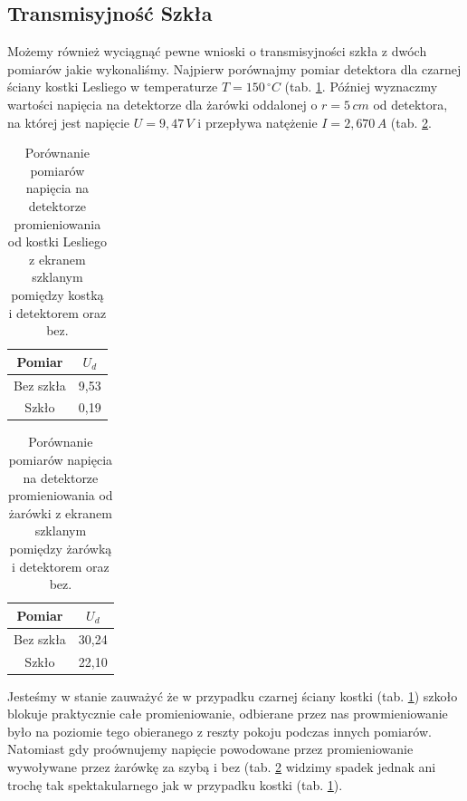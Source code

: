 \documentclass[12pt]{article}
\begin{document}
\subsection{Transmisyjność Szkła}
Możemy również wyciągnąć pewne wnioski o transmisyjności szkła z dwóch pomiarów jakie wykonaliśmy. Najpierw porównajmy pomiar detektora dla czarnej ściany kostki Lesliego w temperaturze $T = 150 \, ^{\circ}C$ (tab. \ref{tab:cube_glass}. Później wyznaczmy wartości napięcia na detektorze dla żarówki oddalonej o $r = 5 \, cm$ od detektora, na której jest napięcie $U = 9{,}47 \, V$ i przepływa natężenie $I = 2{,}670 \, A$ (tab. \ref{tab:bulb_glass}.
\begin{table}[H]
    \centering
    \begin{tabular}{cc}
        \toprule
        Pomiar & $U_d$ \\
        \midrule
        Bez szkła & 9{,}53 \\
        Szkło & 0{,}19 \\
        \bottomrule
    \end{tabular}
    \caption{Porównanie pomiarów napięcia na detektorze promieniowania od kostki Lesliego z ekranem szklanym pomiędzy kostką i detektorem oraz bez.}
    \label{tab:cube_glass}
\end{table}
\begin{table}[H]
    \centering
    \begin{tabular}{cc}
        \toprule
        Pomiar & $U_d$ \\
        \midrule
        Bez szkła & 30{,}24 \\
        Szkło & 22{,}10 \\
        \bottomrule
    \end{tabular}
    \caption{Porównanie pomiarów napięcia na detektorze promieniowania od żarówki z ekranem szklanym pomiędzy żarówką i detektorem oraz bez.}
    \label{tab:bulb_glass}
\end{table}
Jesteśmy w stanie zauważyć że w przypadku czarnej ściany kostki (tab. \ref{tab:cube_glass}) szkoło blokuje praktycznie całe promieniowanie, odbierane przez nas prowmieniowanie było na poziomie tego obieranego z reszty pokoju podczas innych pomiarów. Natomiast gdy proównujemy napięcie powodowane przez promieniowanie wywoływane przez żarówkę za szybą i bez (tab. \ref{tab:bulb_glass} widzimy spadek jednak ani trochę tak spektakularnego jak w przypadku kostki (tab. \ref{tab:cube_glass}).
\end{document}
